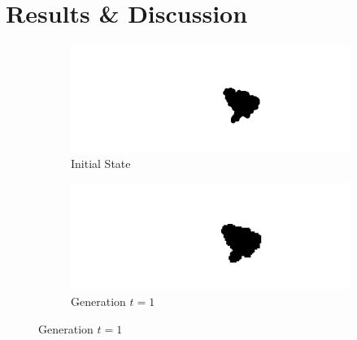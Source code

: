 \chapter{Results \& Discussion} %
\label{Chapter4} %
\Blindtext
\begin{figure}[H]

\begin{multicols}{2}
\begin{subfigure}{.5\textwidth}
  \centering
  \includegraphics[width=1\linewidth]{Figures/Chapter4/generation-0-melusi}
  \caption{Initial State}
\end{subfigure}
\columnbreak
\begin{subfigure}{.5\textwidth}
  \centering
  \includegraphics[width=1\linewidth]{Figures/Chapter4/generation-1-melusi}
  \caption{Generation $t = 1$}
\end{subfigure}
\end{multicols}


\end{figure}
